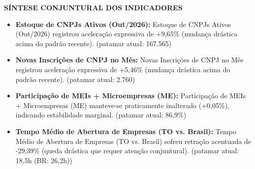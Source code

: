 \documentclass[10pt,a4paper]{article}
\begin{document}
{\begin{tikzpicture}[baseline=(box.base)]
\end{tikzpicture}\hfill%
%
}

\vspace{0.08cm}
\par\vspace{0.05cm}
\par\vspace{4pt}
{\fontsize{7.8}{9.4}\selectfont\bfseries\color{corprimaria}\MakeUppercase{Síntese Conjuntural dos Indicadores}}\par\vspace{2pt}
{\scriptsize\color{cinzatexto}
\begin{itemize}[leftmargin=10pt, itemsep=1.2pt, topsep=1pt, parsep=0pt]
   \item \textbf{\color{corprimaria}Estoque de CNPJs Ativos (Out/2026):} Estoque de CNPJs Ativos (Out/2026) registrou aceleração expressiva de +9,65\% (mudança drástica acima do padrão recente). (patamar atual: 167.565)
   \item \textbf{\color{corprimaria}Novas Inscrições de CNPJ no Mês:} Novas Inscrições de CNPJ no Mês registrou aceleração expressiva de +5,46\% (mudança drástica acima do padrão recente). (patamar atual: 2.760)
   \item \textbf{\color{corprimaria}Participação de MEIs + Microempresas (ME):} Participação de MEIs + Microempresas (ME) manteve-se praticamente inalterado (+0,05\%), indicando estabilidade marginal. (patamar atual: 86,9\%)
   \item \textbf{\color{corprimaria}Tempo Médio de Abertura de Empresas (TO vs. Brasil):} Tempo Médio de Abertura de Empresas (TO vs. Brasil) sofreu retração acentuada de -29,39\% (queda drástica que requer atenção conjuntural). (patamar atual: 18,5h (BR: 26,2h))
\end{itemize}
}
\par\vspace{0.05cm}
\end{document}
